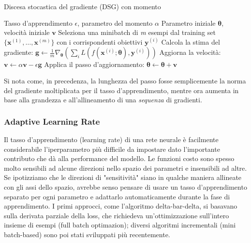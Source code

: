 \documentclass[12pt,a4paper]{report}
\begin{document}
    \begin{algorithm} 
        \caption{Discesa stocastica del gradiente (DSG) con momento}
        \begin{algorithmic} \label{dsgwithmomentum}
            \REQUIRE Tasso d'apprendimento $\epsilon$, parametro del momento $\alpha$
            \REQUIRE Parametro iniziale $\boldsymbol{\theta}$, velocit\`a iniziale $\boldsymbol{v}$
            \STATE Seleziona una minibatch di \textit{m} esempi dal training set $\{\boldsymbol{x}^{(1)}, \dots, \boldsymbol{x}^{(m)}\}$ con i corrispondenti obiettivi $\boldsymbol{y}^{(i)}$
            \STATE Calcola la stima del gradiente: $\boldsymbol{g}\leftarrow \frac{1}{m}\nabla_{\boldsymbol{\theta}}(\sum_{i} L(f(\boldsymbol{x}^{(i)}; \boldsymbol{\theta}), \boldsymbol{y}^{(i)}))$
            \STATE Aggiorna la velocit\`a: $\boldsymbol{v}\leftarrow\alpha\boldsymbol{v}-\epsilon\boldsymbol{g}$
            \STATE Applica il passo d'aggiornamento: $\boldsymbol{\theta}\leftarrow\boldsymbol{\theta}+\boldsymbol{v}$
            \ENDWHILE
        \end{algorithmic}
    \end{algorithm}
    Si nota come, in precedenza, la lunghezza del passo fosse 
    semplicemente la norma del gradiente moltiplicata per il tasso 
    d'apprendimento, mentre ora aumenta in base alla grandezza e 
    all'allineamento di una \textit{sequenza} di gradienti.
    
    \subsubsection{Adaptive Learning Rate}
    Il tasso d'apprendimento (learning rate) di una rete neurale \`e
    facilmente considerabile l'iperparametro pi\`u difficile da 
    impostare dato l'importante contributo che d\`a alla performance del
    modello. Le funzioni costo sono spesso molto sensibili ad alcune 
    direzioni nello spazio dei parametri e insensibili ad altre. Se
    ipotizziamo che le direzioni di "sensitivit\`a" siano in qualche
    maniera allineate con gli assi dello spazio, avrebbe senso pensare 
    di usare un tasso d'apprendimento separato per ogni parametro e 
    adattarlo automaticamente durante la fase di apprendimento. I primi
    approcci, come l'algoritmo delta-bar-delta, si basavano sulla 
    derivata parziale della loss, che richiedeva un'ottimizzazione 
    sull'intero insieme di esempi (full batch optimazion); diversi 
    algoritmi incrementali (mini batch-based) sono poi stati sviluppati
    pi\`u recentemente. 
\end{document}
